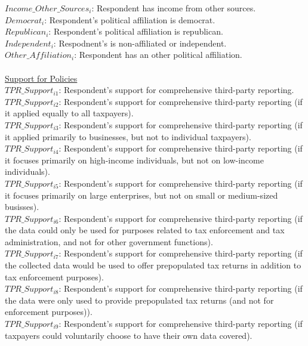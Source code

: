 \documentclass[11pt]{article}
\begin{document}
$Income\_Other\_Sources_i$: Respondent has income from other sources. \\[0.15em]
$Democrat_i$: Respondent's political affiliation is democrat. \\[0.15em]
$Republican_i$: Respondent's political affiliation is republican. \\[0.15em]
$Independent_i$: Respodnent's is non-affiliated or independent. \\[0.15em]
$Other\_Affiliation_i$: Respondent has an other political affiliation. \\[0.15em]
\\
\underline{Support for Policies} \\[0.15em]
$TPR\_Support_{i1}$: Respondent's support for comprehensive third-party reporting. \\[0.15em]
$TPR\_Support_{i2}$: Respondent's support for comprehensive third-party reporting (if it applied equally to all taxpayers). \\[0.15em]
$TPR\_Support_{i3}$: Respondent's support for comprehensive third-party reporting (if it applied primarily to businesses, but not to individual taxpayers). \\[0.15em]
$TPR\_Support_{i4}$: Respondent's support for comprehensive third-party reporting (if it focuses primarily on high-income individuals, but not on low-income individuals). \\[0.15em]
$TPR\_Support_{i5}$: Respondent's support for comprehensive third-party reporting (if it focuses primarily on large enterprises, but not on small or medium-sized busisses). \\[0.15em]
$TPR\_Support_{i6}$: Respondent's support for comprehensive third-party reporting (if the data could only be used for purposes related to tax enforcement and tax administration, and not for other government functions). \\[0.15em]
$TPR\_Support_{i7}$: Respondent's support for comprehensive third-party reporting (if the collected data would be used to offer prepopulated tax returns in addition to tax enforcement purposes). \\[0.15em]
$TPR\_Support_{i8}$: Respondent's support for comprehensive third-party reporting (if the data were only used to provide prepopulated tax returns (and not for enforcement purposes)). \\[0.15em]
$TPR\_Support_{i9}$: Respondent's support for comprehensive third-party reporting (if taxpayers could voluntarily choose to have their own data covered). \\[0.15em]
\end{document}
